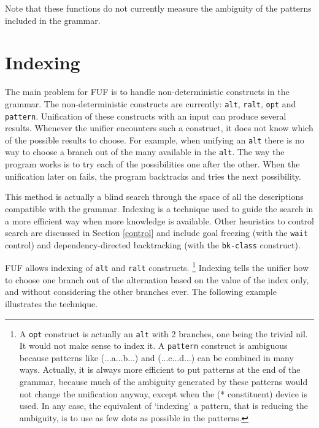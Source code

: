 \documentclass[10pt,a4paper]{report}
\begin{document}
Note that these functions do not currently measure the ambiguity
of the patterns included in the grammar.



\section{Indexing}

The main problem for FUF is to handle non-deterministic constructs in the
grammar. The non-deterministic constructs are currently: {\tt alt},
{\tt ralt}, {\tt opt} and {\tt pattern}. Unification of these constructs
with an input can produce several results. Whenever the unifier encounters
such a construct, it does not know which of the possible results to choose.
For example, when unifying an {\tt alt} there is no way to choose a branch
out of the many available in the {\tt alt}. The way the program works is to
try each of the possibilities one after the other. When the unification
later on fails, the program backtracks and tries the next possibility.

This method is actually a blind search through the space of all
the descriptions compatible with the grammar. Indexing is a
technique used to guide the search in a more efficient way when
more knowledge is available. Other heuristics to control search are
discussed in Section \ref{control} and include goal freezing (with the
{\tt wait} control) and dependency-directed backtracking (with the
{\tt bk-class} construct).

FUF allows indexing of {\tt alt} and {\tt ralt} constructs.  \footnote{A
{\tt opt} construct is actually an {\tt alt} with 2 branches, one being the
trivial nil. It would not make sense to index it. A {\tt pattern} construct
is ambiguous because patterns like (...a...b...) and (...c...d...) can be
combined in many ways.  Actually, it is always more efficient to put
patterns at the end of the grammar, because much of the ambiguity generated
by these patterns would not change the unification anyway, except when the
(* constituent) device is used. In any case, the equivalent of `indexing' a
pattern, that is reducing the ambiguity, is to use as few dots as possible
in the patterns.}  Indexing tells the unifier how to choose one branch
out of the alternation based on the value of the index only, and without
considering the other branches ever. The following example illustrates the
technique.
\end{document}
